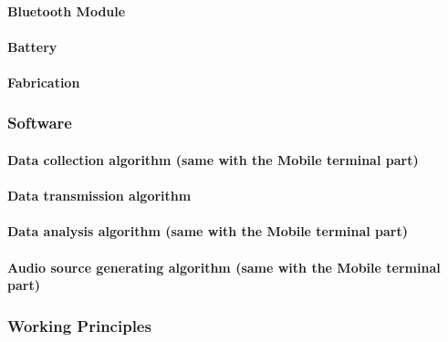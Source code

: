 \paragraph{Bluetooth Module}
\paragraph{Battery}
\paragraph{Fabrication}
\subsubsection{Software}
\paragraph{Data collection algorithm (same with the Mobile terminal part)}
\paragraph{Data transmission algorithm}
\paragraph{ Data analysis algorithm (same with the Mobile terminal part)}
\paragraph{Audio source generating algorithm (same with the Mobile terminal part)}
\subsubsection{Working Principles}